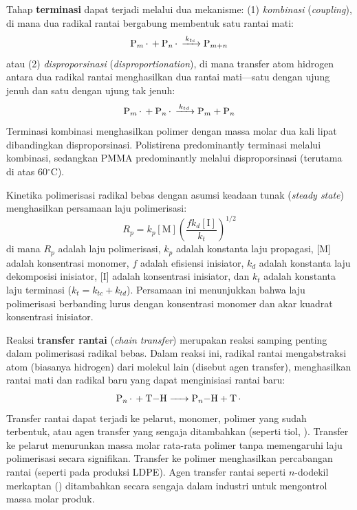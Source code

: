 \documentclass[12pt,a4paper,openany]{book}
\begin{document}
Tahap \textbf{terminasi} dapat terjadi melalui dua mekanisme: (1) \textit{kombinasi} (\textit{coupling}), di mana dua radikal rantai bergabung membentuk satu rantai mati:
\begin{equation}
  \ce{P_m. + P_n. ->[$k_{tc}$] P_{m+n}}
\end{equation}
atau (2) \textit{disproporsinasi} (\textit{disproportionation}), di mana transfer atom hidrogen antara dua radikal rantai menghasilkan dua rantai mati---satu dengan ujung jenuh dan satu dengan ujung tak jenuh:
\begin{equation}
  \ce{P_m. + P_n. ->[$k_{td}$] P_m + P_n}
\end{equation}
Terminasi kombinasi menghasilkan polimer dengan massa molar dua kali lipat dibandingkan disproporsinasi. Polistirena predominantly terminasi melalui kombinasi, sedangkan PMMA predominantly melalui disproporsinasi (terutama di atas 60$^\circ$C).

Kinetika polimerisasi radikal bebas dengan asumsi keadaan tunak (\textit{steady state}) menghasilkan persamaan laju polimerisasi:
\begin{equation}
  R_p = k_p[\text{M}]\left(\frac{fk_d[\text{I}]}{k_t}\right)^{1/2}
\end{equation}
di mana $R_p$ adalah laju polimerisasi, $k_p$ adalah konstanta laju propagasi, [M] adalah konsentrasi monomer, $f$ adalah efisiensi inisiator, $k_d$ adalah konstanta laju dekomposisi inisiator, [I] adalah konsentrasi inisiator, dan $k_t$ adalah konstanta laju terminasi ($k_t = k_{tc} + k_{td}$). Persamaan ini menunjukkan bahwa laju polimerisasi berbanding lurus dengan konsentrasi monomer dan akar kuadrat konsentrasi inisiator.

Reaksi \textbf{transfer rantai} (\textit{chain transfer}) merupakan reaksi samping penting dalam polimerisasi radikal bebas. Dalam reaksi ini, radikal rantai mengabstraksi atom (biasanya hidrogen) dari molekul lain (disebut agen transfer), menghasilkan rantai mati dan radikal baru yang dapat menginisiasi rantai baru:
\begin{equation}
  \ce{P_n. + T-H -> P_n-H + T.}
\end{equation}
Transfer rantai dapat terjadi ke pelarut, monomer, polimer yang sudah terbentuk, atau agen transfer yang sengaja ditambahkan (seperti tiol, ). Transfer ke pelarut menurunkan massa molar rata-rata polimer tanpa memengaruhi laju polimerisasi secara signifikan. Transfer ke polimer menghasilkan percabangan rantai (seperti pada produksi LDPE). Agen transfer rantai seperti $n$-dodekil merkaptan () ditambahkan secara sengaja dalam industri untuk mengontrol massa molar produk.
\end{document}
